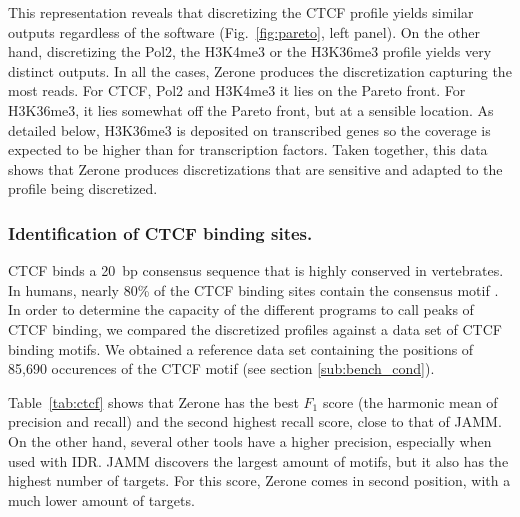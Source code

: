 \documentclass{bioinfo}
\begin{document}
This representation reveals that discretizing the CTCF profile yields
similar outputs regardless of the software (Fig.~\ref{fig:pareto},
left panel). On the other hand, discretizing the Pol2, the H3K4me3 or
the H3K36me3 profile yields very distinct outputs. In
all the cases, Zerone produces the discretization capturing the most
reads. For CTCF, Pol2 and H3K4me3 it lies on the Pareto front. For
H3K36me3, it lies somewhat off the Pareto front, but at a sensible
location. As detailed below, H3K36me3 is deposited on transcribed
genes \citep{pmid16122420,pmid23739122} so the coverage is expected to
be higher than for transcription factors. Taken together, this data
shows that Zerone produces discretizations that are sensitive and
adapted to the profile being discretized.

\subsubsection{Identification of CTCF binding sites.}
CTCF binds a 20~bp consensus sequence that is highly conserved in
vertebrates. In humans, nearly 80\% of the CTCF binding sites contain
the consensus motif \citep{pmid17382889}. In order to determine the
capacity of the different programs to call peaks of CTCF binding, we
compared the discretized profiles against a data set of CTCF binding
motifs. We obtained a reference data set containing the positions of
85,690 occurences of the CTCF motif (see section
\ref{sub:bench_cond}).

Table~\ref{tab:ctcf} shows that Zerone has the best $F_1$ score (the
harmonic mean of precision and recall) and the second highest recall
score, close to that of JAMM. On the other hand, several other tools
have a higher precision, especially when used with IDR. JAMM discovers
the largest amount of motifs, but it also has the highest number
of targets. For this score, Zerone comes in second position, with a
much lower amount of targets.
\end{document}
